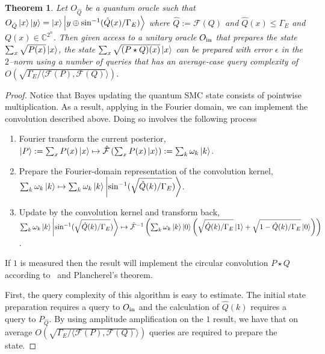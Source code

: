 \documentclass[aps,amsmath,onecolumn,amssymb]{revtex4}
\newtheorem{theorem}{Theorem}
\begin{document}
\begin{theorem}
Let  $O_{\hat{Q}}$ be a quantum oracle such that $O_{\hat{Q}}\left|x\right\rangle \left|y\right\rangle = \left|x\right\rangle \left|y\oplus \sin^{-1}(\hat{Q} (x)/\Gamma_E)\right\rangle$ where $\hat{Q}:=\mathcal{F}(Q)$ and $\hat{Q}(x)\le \Gamma_E$ and $Q(x) \in \mathbb{C}^{2^n}$.  Then given access to a unitary oracle $O_{\rm in}$ that prepares the state $\sum_x \sqrt{P(x)}\left|x\right\rangle$, the state $\sum_x \sqrt{(P\star Q) (x)}\left|x\right\rangle$ can be prepared with error $\epsilon$ in the $2$--norm using a number of queries that has an average-case query complexity of $O(\sqrt{\Gamma_E/ \langle \mathcal{F}(P), \mathcal{F}(Q)}\rangle)$.
\end{theorem}
\begin{proof}
Notice that Bayes updating the quantum SMC state consists of pointwise multiplication. As a result, applying  in the Fourier domain, we can implement the convolution described above.  Doing so involves the following process
\begin{enumerate}
\item  Fourier transform the current posterior, $\left|P\right\rangle:=\sum_x P(x) \left|x\right\rangle \mapsto \hat{\mathcal{F}}\left(\sum_x P(x) \left|x\right\rangle \right):= \sum_k \omega_k \left|k\right\rangle$.
\item Prepare the Fourier-domain representation of the convolution kernel, \\$\sum_k \omega_k \left|k\right\rangle\mapsto \sum_k \omega_k \left|k\right\rangle\left|\sin^{-1}(\sqrt{\hat{Q}(k)/\Gamma_E})\right\rangle$.
\item Update by the convolution kernel and transform back, \\$\sum_k \omega_k \left|k\right\rangle\left|\sin^{-1}(\sqrt{\hat{Q}(k)/\Gamma_E})\right\rangle\mapsto \hat{\mathcal{F}}^{-1}\left(\sum_k \omega_k \left|k\right\rangle\left|0\right\rangle\left(\sqrt{\hat{Q}(k)/\Gamma_E}\left|1\right\rangle+\sqrt{1-\hat{Q}(k)/\Gamma_E}\left|0\right\rangle \right)\right)$.
\end{enumerate}
If $1$ is measured then the result will implement the circular convolution $P \star Q$ according to~ and Plancherel's theorem.

First, the query complexity of this algorithm is easy to estimate.  The initial state preparation requires a query to $O_{\rm in}$ and the calculation of $\hat{Q}(k)$ requires a query to $P_{\hat{Q}}$.  By using amplitude amplification on the $1$ result, we have that on average $O(\sqrt{\Gamma_E/ \langle \mathcal{F}(P), \mathcal{F}(Q)}\rangle)$ queries are required to prepare the state.


\end{proof}
\end{document}
